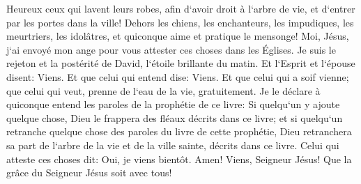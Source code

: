 \verse Heureux ceux qui lavent leurs robes, afin d`avoir droit à l`arbre de vie, et d`entrer par les portes dans la ville! 
\verse Dehors les chiens, les enchanteurs, les impudiques, les meurtriers, les idolâtres, et quiconque aime et pratique le mensonge! 
\verse Moi, Jésus, j`ai envoyé mon ange pour vous attester ces choses dans les Églises. Je suis le rejeton et la postérité de David, l`étoile brillante du matin. 
\verse Et l`Esprit et l`épouse disent: Viens. Et que celui qui entend dise: Viens. Et que celui qui a soif vienne; que celui qui veut, prenne de l`eau de la vie, gratuitement. 
\verse Je le déclare à quiconque entend les paroles de la prophétie de ce livre: Si quelqu`un y ajoute quelque chose, Dieu le frappera des fléaux décrits dans ce livre; 
\verse et si quelqu`un retranche quelque chose des paroles du livre de cette prophétie, Dieu retranchera sa part de l`arbre de la vie et de la ville sainte, décrits dans ce livre. 
\verse Celui qui atteste ces choses dit: Oui, je viens bientôt. Amen! Viens, Seigneur Jésus! 
\verse Que la grâce du Seigneur Jésus soit avec tous! 
